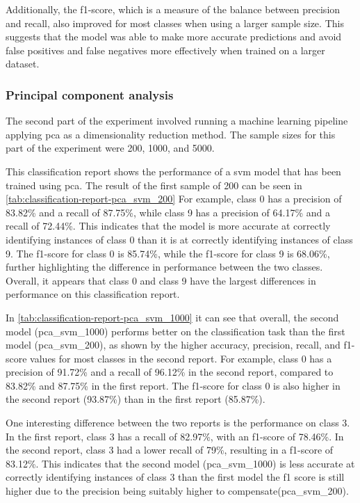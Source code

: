 Additionally, the f1-score, which is a measure of the balance between precision and recall, also improved for most classes when using a larger sample size. This suggests that the model was able to make more accurate predictions and avoid false positives and false negatives more effectively when trained on a larger dataset.


\subsubsection{Principal component analysis}\label{subsubsec:experiment_4_pca}

The second part of the experiment involved running a machine learning pipeline applying \gls{pca} as a dimensionality reduction method. The sample sizes for this part of the experiment were 200, 1000, and 5000.



This classification report shows the performance of a \gls{svm} model that has been trained using \gls{pca}. The result of the first sample of 200 can be seen in \ref{tab:classification-report-pca_svm_200}
For example, class 0 has a precision of 83.82\% and a recall of 87.75\%, while class 9 has a precision of 64.17\% and a recall of 72.44\%. This indicates that the model is more accurate at correctly identifying instances of class 0 than it is at correctly identifying instances of class 9. The f1-score for class 0 is 85.74\%, while the f1-score for class 9 is 68.06\%, further highlighting the difference in performance between the two classes. Overall, it appears that class 0 and class 9 have the largest differences in performance on this classification report.



In \ref{tab:classification-report-pca_svm_1000} it can see that overall, the second model (pca\_svm\_1000) performs better on the classification task than the first model (pca\_svm\_200), as shown by the higher accuracy, precision, recall, and f1-score values for most classes in the second report. For example, class 0 has a precision of 91.72\% and a recall of 96.12\% in the second report, compared to 83.82\% and 87.75\% in the first report. The f1-score for class 0 is also higher in the second report (93.87\%) than in the first report (85.87\%).

One interesting difference between the two reports is the performance on class 3. In the first report, class 3 has a recall of 82.97\%, with an f1-score of 78.46\%. In the second report, class 3 had a lower recall of 79\%, resulting in a f1-score of 83.12\%. This indicates that the second model (pca\_svm\_1000) is less accurate at correctly identifying instances of class 3 than the first model the f1 score is still higher due to the precision being suitably higher to compensate(pca\_svm\_200).

